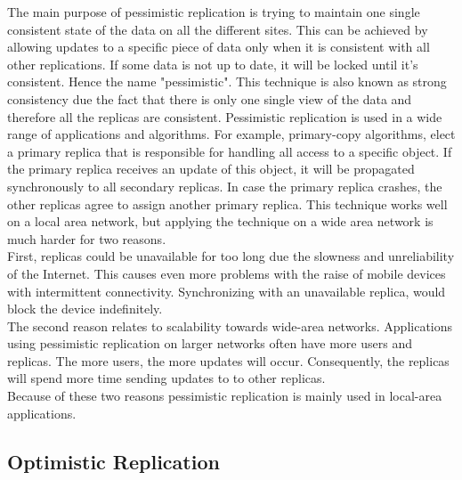 \documentclass[a4paper,12pt]{report}
\begin{document}
The main purpose of pessimistic replication is trying to maintain one single consistent state of the data on all the different sites. This can be achieved by allowing updates to a specific piece of data only when it is consistent with all other replications. If some data is not up to date, it will be locked until it's consistent. Hence the name "pessimistic". This technique is also known as strong consistency due the fact that there is only one single view of the data and therefore all the replicas are consistent. Pessimistic replication is used in a wide range of applications and algorithms. For example, primary-copy algorithms, elect a primary replica that is responsible for handling all access to a specific object. If the primary replica receives an update of this object, it will be propagated synchronously to all secondary replicas. In case the primary replica crashes, the other replicas agree to assign another primary replica. This technique works well on a local area network, but applying the technique on a wide area network is much harder for two reasons. \\
\indent First, replicas could be unavailable for too long due the slowness and unreliability of the Internet. This causes even more problems with the raise of mobile devices with intermittent connectivity. Synchronizing with an unavailable replica, would block the device indefinitely. \\
\indent The second reason relates to scalability towards wide-area networks. Applications using pessimistic replication on larger networks often have more users and replicas. The more users, the more updates will occur. Consequently, the replicas will spend more time sending updates to to other replicas. \\
Because of these two reasons pessimistic replication is mainly used in local-area applications. 

\subsection{Optimistic Replication}\label{sec:OptimisticReplication}
\end{document}
